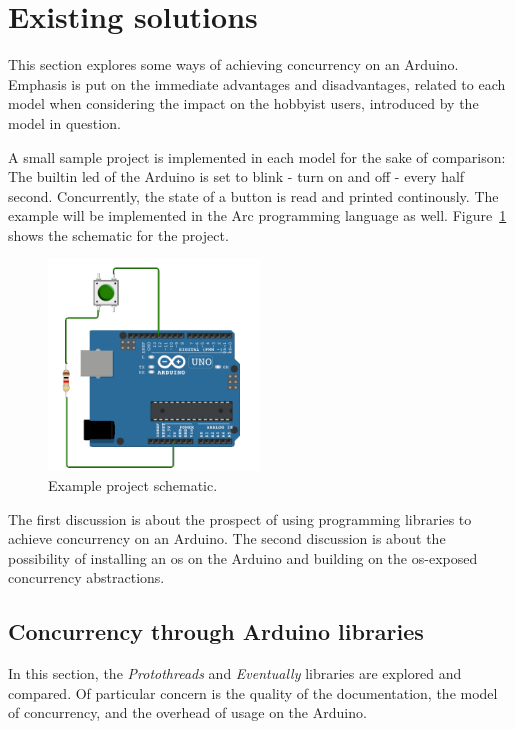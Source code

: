 \section{Existing solutions}\label{sec:existingsolutions}
This section explores some ways of achieving concurrency on an Arduino. Emphasis is put on the immediate advantages and disadvantages, related to each model when considering the impact on the hobbyist users, introduced by the model in question.

A small sample project is implemented in each model for the sake of comparison: The builtin \gls{led} of the Arduino is set to blink - turn on and off - every half second. Concurrently, the state of a button is read and printed continously. The example will be implemented in the Arc programming language as well. Figure~\ref{fig:exampleprojectschematic} shows the schematic for the project.


\begin{figure}[htb!]
  \centering
  \includegraphics[width=0.5\textwidth]{figures/Example_Project}
  \caption{Example project schematic.}
  \label{fig:exampleprojectschematic}
\end{figure}


The first discussion is about the prospect of using programming libraries to achieve concurrency on an Arduino. The second discussion is about the possibility of installing an \gls{os} on the Arduino and building on the \gls{os}-exposed concurrency abstractions.

\subsection{Concurrency through Arduino libraries}\label{subsec:arduinolibraries}
In this section, the \textit{Protothreads} and \textit{Eventually} libraries are explored and compared. Of particular concern is the quality of the documentation, the model of concurrency, and the overhead of usage on the Arduino.

